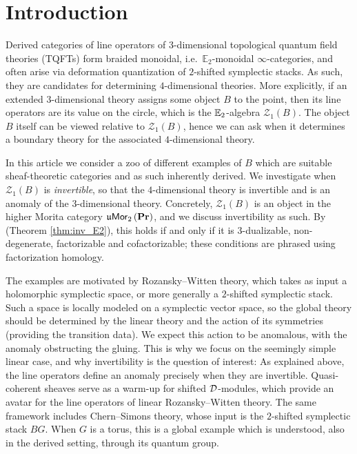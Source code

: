 \section{Introduction}
\label{sec:intro}

Derived categories of line operators of $3$-dimensional topological quantum field theories (TQFTs) form braided monoidal, i.e.~$\mathbb{E}_2$-monoidal $\infty$-categories, and often arise via
deformation quantization of $2$-shifted symplectic stacks.
As such, they are candidates for determining $4$-dimensional theories.
More explicitly, if an extended $3$-dimensional theory assigns some object $B$ to the point,
then its line operators are its value on the circle, which is the $\mathbb{E}_2$-algebra
$\mathcal{Z}_1\left(B\right)$.
The object $B$ itself can be viewed relative to $\mathcal{Z}_1\left(B\right)$, hence we can ask when it determines a boundary theory for the
associated $4$-dimensional theory.

In this article we consider a zoo of different examples of $B$ which are suitable sheaf-theoretic categories and as such inherently derived.
We investigate when $\mathcal{Z}_1\left(B\right)$ is {\em invertible}, so that
the $4$-dimensional theory is invertible and is an anomaly of the $3$-dimensional theory. Concretely, $\mathcal{Z}_1\left(B\right)$ is an object in the higher Morita category $\mathfrak{u}\mathsf{Mor}_2\left(\mathbf{Pr}\right)$, and we discuss invertibility as such. By \cite{BJSS, SSS} (Theorem \ref{thm:inv_E2}), this holds if and only if it is $3$-dualizable,
non-degenerate, factorizable and cofactorizable; these conditions are phrased using factorization homology.

The examples are motivated by Rozansky--Witten theory, which takes as input a holomorphic
symplectic space, or more generally a $2$-shifted symplectic stack.
Such a space is locally modeled on a symplectic vector space, so the global theory should
be determined by the linear theory and the action of its symmetries (providing
the transition data).
We expect this action to be anomalous, with the anomaly obstructing the gluing.
This is why we focus on the seemingly simple linear case, and why invertibility is the
question of interest: As explained above, the line operators define an anomaly precisely
when they are invertible.
Quasi-coherent sheaves serve as a warm-up for shifted $\mathcal{D}$-modules, which provide an avatar
for the line operators of linear Rozansky--Witten theory.
The same framework includes Chern--Simons theory, whose input is the $2$-shifted symplectic
stack $BG$.
When $G$ is a torus, this is a global example which is understood, also in the derived
setting, through its quantum group.


